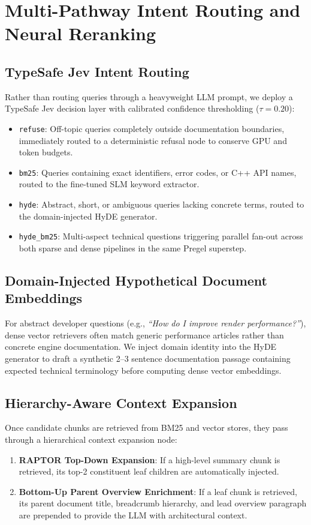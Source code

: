 \documentclass[sigconf,nonacm]{acmart}
\begin{document}
\section{Multi-Pathway Intent Routing and Neural Reranking}

\subsection{TypeSafe Jev Intent Routing}
Rather than routing queries through a heavyweight LLM prompt, we deploy a TypeSafe Jev decision layer with calibrated confidence thresholding ($\tau = 0.20$):
\begin{itemize}
    \item \texttt{refuse}: Off-topic queries completely outside documentation boundaries, immediately routed to a deterministic refusal node to conserve GPU and token budgets.
    \item \texttt{bm25}: Queries containing exact identifiers, error codes, or C++ API names, routed to the fine-tuned SLM keyword extractor.
    \item \texttt{hyde}: Abstract, short, or ambiguous queries lacking concrete terms, routed to the domain-injected HyDE generator.
    \item \texttt{hyde\_bm25}: Multi-aspect technical questions triggering parallel fan-out across both sparse and dense pipelines in the same Pregel superstep.
\end{itemize}

\subsection{Domain-Injected Hypothetical Document Embeddings}
For abstract developer questions (e.g., \emph{``How do I improve render performance?''}), dense vector retrievers often match generic performance articles rather than concrete engine documentation. We inject domain identity into the HyDE generator to draft a synthetic 2--3 sentence documentation passage containing expected technical terminology before computing dense vector embeddings.

\subsection{Hierarchy-Aware Context Expansion}
Once candidate chunks are retrieved from BM25 and vector stores, they pass through a hierarchical context expansion node:
\begin{enumerate}
    \item \textbf{RAPTOR Top-Down Expansion}: If a high-level summary chunk is retrieved, its top-2 constituent leaf children are automatically injected.
    \item \textbf{Bottom-Up Parent Overview Enrichment}: If a leaf chunk is retrieved, its parent document title, breadcrumb hierarchy, and lead overview paragraph are prepended to provide the LLM with architectural context.
\end{enumerate}
\end{document}
